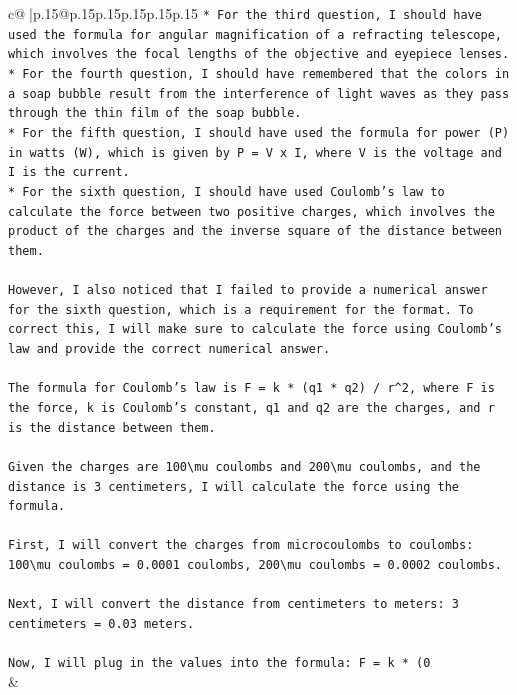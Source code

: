 \documentclass{article}
\begin{document}
{\begin{supertabular}{c@{$\;$}|p{.15\linewidth}@{}p{.15\linewidth}p{.15\linewidth}p{.15\linewidth}p{.15\linewidth}p{.15\linewidth}}
{{{\texttt{* For the third question, I should have used the formula for angular magnification of a refracting telescope, which involves the focal lengths of the objective and eyepiece lenses.} \\
\texttt{* For the fourth question, I should have remembered that the colors in a soap bubble result from the interference of light waves as they pass through the thin film of the soap bubble.} \\
\texttt{* For the fifth question, I should have used the formula for power (P) in watts (W), which is given by P = V x I, where V is the voltage and I is the current.} \\
\texttt{* For the sixth question, I should have used Coulomb's law to calculate the force between two positive charges, which involves the product of the charges and the inverse square of the distance between them.} \\
\\ 
\texttt{However, I also noticed that I failed to provide a numerical answer for the sixth question, which is a requirement for the format. To correct this, I will make sure to calculate the force using Coulomb's law and provide the correct numerical answer.} \\
\\ 
\texttt{The formula for Coulomb's law is F = k * (q1 * q2) / r\^{}2, where F is the force, k is Coulomb's constant, q1 and q2 are the charges, and r is the distance between them.} \\
\\ 
\texttt{Given the charges are 100\textbackslash{}mu coulombs and 200\textbackslash{}mu coulombs, and the distance is 3 centimeters, I will calculate the force using the formula.} \\
\\ 
\texttt{First, I will convert the charges from microcoulombs to coulombs: 100\textbackslash{}mu coulombs = 0.0001 coulombs, 200\textbackslash{}mu coulombs = 0.0002 coulombs.} \\
\\ 
\texttt{Next, I will convert the distance from centimeters to meters: 3 centimeters = 0.03 meters.} \\
\\ 
\texttt{Now, I will plug in the values into the formula: F = k * (0} \\
            }
        }
    }
    & \\ \\

\end{supertabular}
}
\end{document}
